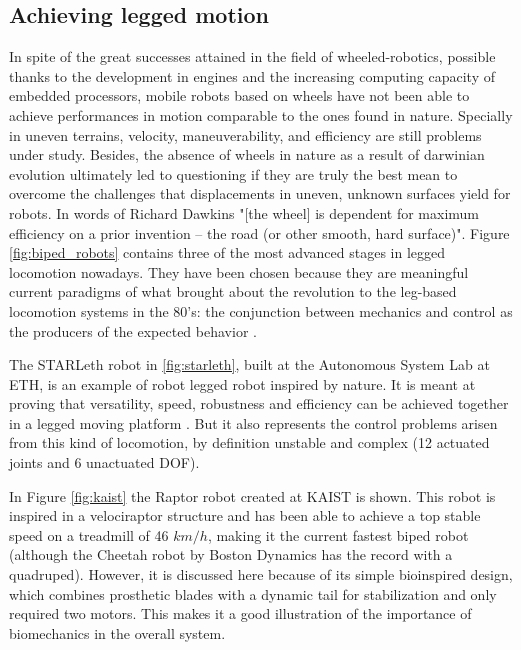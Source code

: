 
\subsection{Achieving legged motion} %
\label{sub:legged_motion_in_robotics}
In spite of the great successes attained in the field of wheeled-robotics, possible thanks to the development in engines and the increasing computing capacity of embedded processors, mobile robots based on wheels have not been able to achieve performances in motion comparable to the ones found in nature.
Specially in uneven terrains, velocity, maneuverability, and efficiency are still problems under study.
Besides, the absence of wheels in nature as a result of darwinian evolution ultimately led to questioning \cite{dawkins} if they are truly the best mean to overcome the challenges that displacements in uneven, unknown surfaces yield for robots.
In words of Richard Dawkins \cite{dawkins} "[the wheel] is dependent for maximum efficiency on a prior invention – the road (or other smooth, hard surface)". 
Figure \ref{fig:biped_robots} contains three of the most advanced stages in legged locomotion nowadays.
They have been chosen because they are meaningful current paradigms of what brought about the revolution to the leg-based locomotion systems in the 80's: the conjunction between mechanics and control as the producers of the expected behavior \cite{mit_leg_lab1}.

The STARLeth robot in \ref{fig:starleth}, built at the Autonomous System Lab at ETH, is an example of robot legged robot inspired by nature. 
It is meant at proving that versatility, speed, robustness and efficiency can be achieved together in a legged moving platform \cite{starleth}.
But it also represents the control problems arisen from this kind of locomotion, by definition unstable and complex (12 actuated joints and 6 unactuated DOF). 

In Figure \ref{fig:kaist} the Raptor robot created at KAIST is shown.
This robot is inspired in a velociraptor structure and has been able to achieve a top stable speed on a treadmill of 46 $km/h$, making it the current fastest biped robot (although the Cheetah robot by Boston Dynamics has the record with a quadruped).
However, it is discussed here because of its simple bioinspired design, which combines prosthetic blades with a dynamic tail for stabilization and only required two motors.
This makes it a good illustration of the importance of biomechanics in the overall system.

